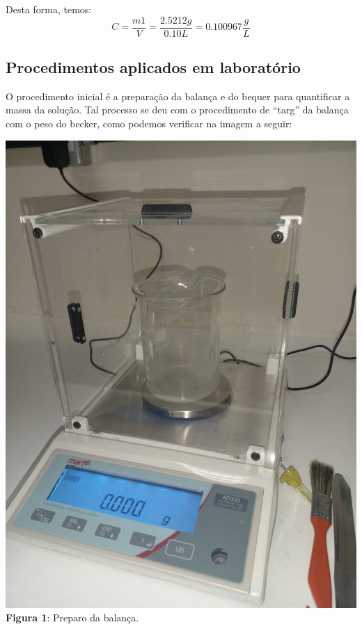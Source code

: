 \documentclass[a4paper, 11pt]{article}
\begin{document}
        \indent Desta forma, temos:
        \begin{equation}
            \label{eq:equacao_concentracao}
            C = \frac{m1}{V}
            = \frac{2.5212g}{0.10L}
            = 0.100967\frac{g}{L}
        \end{equation}

        \subsection{Procedimentos aplicados em laboratório}\label{sec:procedimentos_laboratorio}
        \indent O procedimento inicial é a preparação da balança e do bequer para quantificar a massa da solução\@. Tal processo
        se deu com o procedimento de ``targ'' da balança com o peso do becker, como podemos verificar na imagem a seguir\@: \\
        \begin{center}
            \includegraphics[scale=0.2]{03. preparo da balanca.jpeg}\\
            \singlespacing
            \textbf{Figura 1}: Preparo da balança\@.
        \end{center}
        \doublespacing
\end{document}
